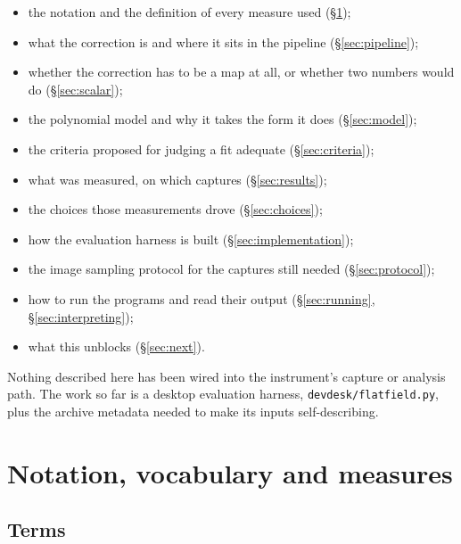 \documentclass[11pt, a4paper]{article}
\newcommand{\code}[1]{\texttt{#1}}
\begin{document}
\begin{itemize}[nosep]
  \item the notation and the definition of every measure used
        (\S\ref{sec:notation});
  \item what the correction is and where it sits in the pipeline
        (\S\ref{sec:pipeline});
  \item whether the correction has to be a map at all,
        or whether two numbers would do (\S\ref{sec:scalar});
  \item the polynomial model and why it takes the form it does
        (\S\ref{sec:model});
  \item the criteria proposed for judging a fit adequate
        (\S\ref{sec:criteria});
  \item what was measured, on which captures (\S\ref{sec:results});
  \item the choices those measurements drove (\S\ref{sec:choices});
  \item how the evaluation harness is built (\S\ref{sec:implementation});
  \item the image sampling protocol for the captures still needed
        (\S\ref{sec:protocol});
  \item how to run the programs and read their output
        (\S\ref{sec:running}, \S\ref{sec:interpreting});
  \item what this unblocks (\S\ref{sec:next}).
\end{itemize}

Nothing described here has been wired into the instrument's capture or
analysis path.
The work so far is a desktop evaluation harness,
\code{devdesk/flatfield.py},
plus the archive metadata needed to make its inputs self-describing.

\section{Notation, vocabulary and measures}
\label{sec:notation}

\subsection{Terms}
\end{document}
